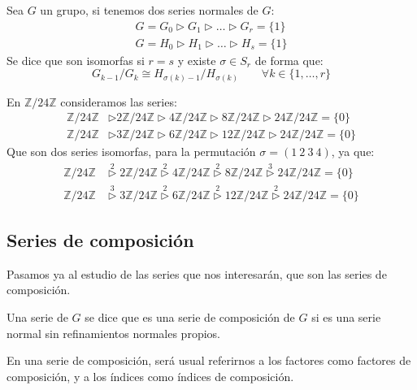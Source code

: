 \begin{definicion}
    Sea $G$ un grupo, si tenemos dos series normales de $G$:
    \begin{gather*}
        G = G_0 \rhd G_1 \rhd \ldots \rhd G_r = \{1\} \\
        G = H_0 \rhd H_1 \rhd \ldots \rhd H_s = \{1\}
    \end{gather*}
    Se dice que son isomorfas si $r=s$ y existe $\sigma\in S_r$ de forma que:
    \begin{equation*}
        G_{k-1}/G_k \cong H_{\sigma(k)-1}/H_{\sigma(k)} \qquad \forall k \in \{1,\ldots,r\}
    \end{equation*}
\end{definicion}

\begin{ejemplo}
    En $\mathbb{Z}/24\mathbb{Z}$ consideramos las series:
    \begin{align*}
        \mathbb{Z}/24\mathbb{Z} &\rhd 2\mathbb{Z}/24\mathbb{Z} \rhd 4\mathbb{Z}/24\mathbb{Z} \rhd 8\mathbb{Z}/24\mathbb{Z} \rhd 24\mathbb{Z}/24\mathbb{Z} = \{0\} \\
        \mathbb{Z}/24\mathbb{Z} &\rhd 3\mathbb{Z}/24\mathbb{Z} \rhd 6\mathbb{Z}/24\mathbb{Z} \rhd 12\mathbb{Z}/24\mathbb{Z} \rhd 24\mathbb{Z}/24\mathbb{Z} = \{0\}
    \end{align*}
    Que son dos series isomorfas, para la permutación $\sigma=(1\ 2\ 3\ 4)$, ya que:
    \begin{align*}
        \mathbb{Z}/24\mathbb{Z} &\stackrel{2}{\rhd} 2\mathbb{Z}/24\mathbb{Z} \stackrel{2}{\rhd} 4\mathbb{Z}/24\mathbb{Z} \stackrel{2}{\rhd} 8\mathbb{Z}/24\mathbb{Z} \stackrel{3}{\rhd} 24\mathbb{Z}/24\mathbb{Z} = \{0\} \\
        \mathbb{Z}/24\mathbb{Z} &\stackrel{3}{\rhd} 3\mathbb{Z}/24\mathbb{Z} \stackrel{2}{\rhd} 6\mathbb{Z}/24\mathbb{Z} \stackrel{2}{\rhd} 12\mathbb{Z}/24\mathbb{Z} \stackrel{2}{\rhd} 24\mathbb{Z}/24\mathbb{Z} = \{0\}
    \end{align*}
\end{ejemplo}

\subsection{Series de composición}
Pasamos ya al estudio de las series que nos interesarán, que son las series de composición.
\begin{definicion}
    Una serie de $G$ se dice que es una serie de composición de $G$ si es una serie normal sin refinamientos normales propios.

    \noindent
    En una serie de composición, será usual referirnos a los factores como factores de composición, y a los índices como índices de composición.
\end{definicion}

